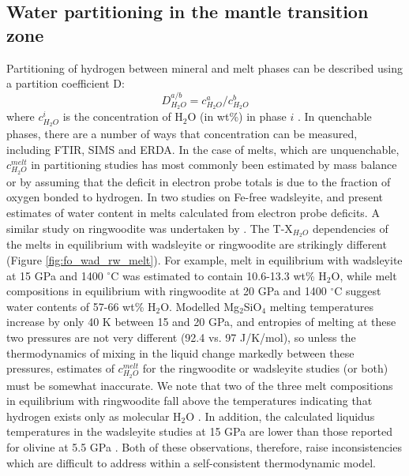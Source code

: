 \documentclass[review]{elsarticle}
\begin{document}
\subsection{Water partitioning in the mantle transition zone}

Partitioning of hydrogen between mineral and melt phases can be described using a partition coefficient D:
\begin{equation}
  D^{a/b}_{H_2O} = c^a_{H_2O} / c^b_{H_2O}
\end{equation}
where $c^i_{H_2O}$ is the concentration of H$_2$O (in wt\%) in phase $i$ \citep{KB2006}. In quenchable phases, there are a number of ways that concentration can be measured, including FTIR, SIMS and ERDA. In the case of melts, which are unquenchable, $c^{melt}_{H_2O}$ in partitioning studies has most commonly been estimated by mass balance or by assuming that the deficit in electron probe totals is due to the fraction of oxygen bonded to hydrogen. In two studies on Fe-free wadsleyite, \cite{DDFK2005} and \cite{LSOK2011} present estimates of water content in melts calculated from electron probe deficits. A similar study on ringwoodite was undertaken by \cite{OMY2000}. The T-X$_{H_2O}$ dependencies of the melts in equilibrium with wadsleyite or ringwoodite are strikingly different (Figure \ref{fig:fo_wad_rw_melt}). For example, melt in equilibrium with wadsleyite at 15 GPa and 1400 $^{\circ}$C was estimated to contain 10.6-13.3 wt\% H$_2$O, while melt compositions in equilibrium with ringwoodite at 20 GPa and 1400 $^{\circ}$C suggest water contents of 57-66 wt\% H$_2$O. Modelled Mg$_2$SiO$_4$ melting temperatures increase by only 40 K between 15 and 20 GPa, and entropies of melting at these two pressures are not very different (92.4 vs. 97 J/K/mol), so unless the thermodynamics of mixing in the liquid change markedly between these pressures, estimates of $c^{melt}_{H_2O}$ for the ringwoodite or wadsleyite studies (or both) must be somewhat inaccurate. We note that two of the three melt compositions in equilibrium with ringwoodite fall above the temperatures indicating that hydrogen exists only as molecular H$_2$O \citep{SS1985}. In addition, the calculated liquidus temperatures in the wadsleyite studies at 15 GPa are lower than those reported for olivine at 5.5 GPa \citep{Inoue1994}. Both of these observations, therefore, raise inconsistencies which are difficult to address within a self-consistent thermodynamic model.
\end{document}
